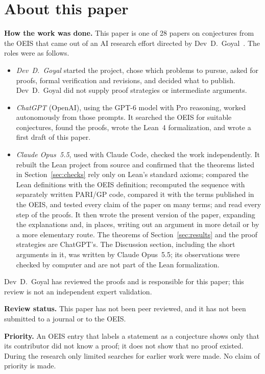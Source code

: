 \documentclass[11pt,a4paper]{article}
\theoremstyle{definition}
\theoremstyle{remark}
\newcommand{\para}[1]{\par\medskip\noindent\textbf{#1}\enspace}
\begin{document}
\section*{About this paper}\label{sec:about}
\para{How the work was done.}
This paper is one of 28 papers on conjectures from the OEIS that came out of an AI research effort directed by
Dev~D.~Goyal~\cite{repo}. The roles were as follows.
\begin{itemize}
\item \emph{Dev~D.~Goyal} started the project, chose which problems to pursue, asked for proofs, formal verification and
revisions, and decided what to publish. Dev~D.~Goyal did not supply proof strategies or intermediate arguments.
\item \emph{ChatGPT} (OpenAI), using the GPT-6 model with Pro reasoning, worked autonomously from those prompts. It
searched the OEIS for suitable conjectures, found the proofs, wrote the Lean~4 formalization, and wrote a first draft
of this paper.
\item \emph{Claude Opus~5.5}, used with Claude Code, checked the work independently. It rebuilt the Lean project from source and confirmed that the theorems listed in Section~\ref{sec:checks} rely only on
Lean's standard axioms; compared the Lean definitions with the OEIS definition; recomputed the sequence with separately
written PARI/GP code, compared it with the terms published in the OEIS, and tested every claim of the paper on many
terms; and read every step of the proofs. It then wrote the present version of the paper, expanding the
explanations and, in places, writing out an argument in more detail or by a more elementary route. The theorems of
Section~\ref{sec:results} and the proof strategies are ChatGPT's. The Discussion section, including the short arguments
in it, was written by Claude Opus~5.5; its observations were checked by computer and are not part of the Lean
formalization.
\end{itemize}
Dev~D.~Goyal has reviewed the proofs and is responsible for this paper; this review is not an independent expert
validation.

\para{Review status.} This paper has not been peer reviewed, and it has not been submitted to a journal or to the OEIS.

\para{Priority.} An OEIS entry that labels a statement as a conjecture shows only that its contributor did not know
a proof; it does not show that no proof existed. During the research only limited searches for earlier work were
made. No claim of priority is made.
\end{document}

